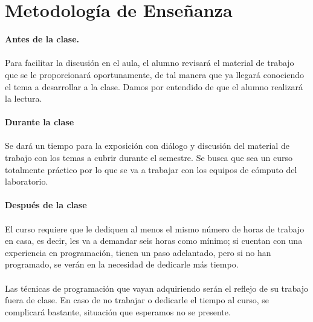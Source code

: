 \documentclass[12pt]{article}
\begin{document}
\section{Metodolog\'{i}a de Enseñanza}
\textbf{Antes de la clase.}
\\
\\
Para facilitar la discusi\'{o}n en el aula, el alumno revisar\'{a} el material de trabajo que se le proporcionar\'{a} oportunamente, de tal manera que ya llegar\'{a} conociendo el tema a desarrollar a la clase. Damos por entendido de que el alumno realizar\'{a} la lectura.
\\
\\
\textbf{Durante la clase}
\\
\\
Se dar\'{a} un tiempo para la exposici\'{o}n con di\'{a}logo y discusi\'{o}n del material de trabajo con los temas a cubrir durante el semestre. Se busca que sea un curso totalmente pr\'{a}ctico por lo que se va a trabajar con los equipos de c\'{o}mputo del laboratorio.
\\
\\
\textbf{Después de la clase}
\\
\\
El curso requiere que le dediquen al menos el mismo n\'{u}mero de horas de trabajo en casa, es decir, les va a demandar seis horas como m\'{i}nimo; si cuentan con una experiencia en programaci\'{o}n, tienen un paso adelantado, pero si no han programado, se ver\'{a}n en la necesidad de dedicarle m\'{a}s tiempo.
\\
\\
Las t\'{e}cnicas de programaci\'{o}n que vayan adquiriendo ser\'{a}n el reflejo de su trabajo fuera de clase. En caso de no trabajar o dedicarle el tiempo al curso, se complicar\'{a} bastante, situaci\'{o}n que esperamos no se presente.
\end{document}
